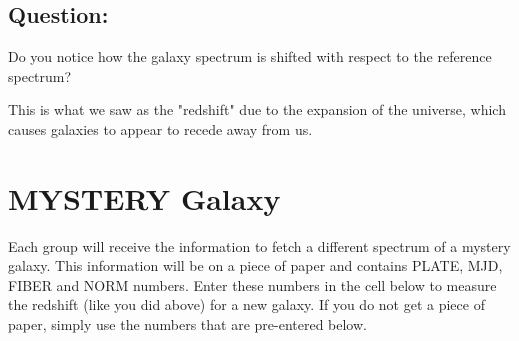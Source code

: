 \documentclass[11pt]{article}
\begin{document}
    \subsection{Question:}\label{question}

Do you notice how the galaxy spectrum is shifted with respect to the
reference spectrum?

This is what we saw as the "redshift" due to the expansion of the
universe, which causes galaxies to appear to recede away from us.

    \section{MYSTERY Galaxy}\label{mystery-galaxy}

Each group will receive the information to fetch a different spectrum of
a mystery galaxy. This information will be on a piece of paper and
contains PLATE, MJD, FIBER and NORM numbers. Enter these numbers in the
cell below to measure the redshift (like you did above) for a new
galaxy. If you do not get a piece of paper, simply use the numbers that
are pre-entered below.
\end{document}
